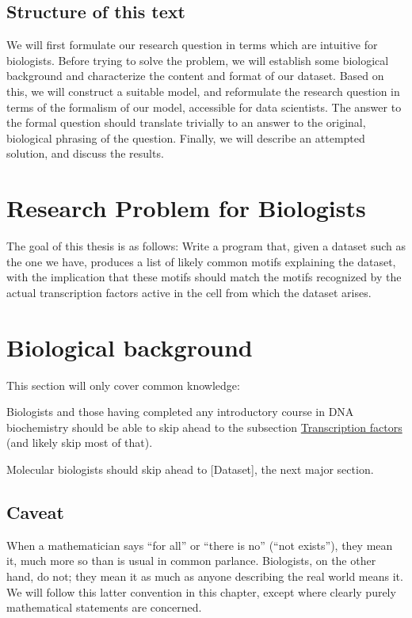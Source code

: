 \documentclass[fleqn]{book}
\begin{document}
\section{Structure of this text}\label{structure-of-this-text}

We will first formulate our research question in terms which are
intuitive for biologists. Before trying to solve the problem, we will
establish some biological background and characterize the content and
format of our dataset. Based on this, we will construct a suitable
model, and reformulate the research question in terms of the formalism
of our model, accessible for data scientists. The answer to the formal
question should translate trivially to an answer to the original,
biological phrasing of the question. Finally, we will describe an
attempted solution, and discuss the results.

\chapter{Research Problem for
Biologists}\label{research-problem-for-biologists}

The goal of this thesis is as follows: Write a program that, given a
dataset such as the one we have, produces a list of likely common motifs
explaining the dataset, with the implication that these motifs should
match the motifs recognized by the actual transcription factors active
in the cell from which the dataset arises.

\chapter{Biological background}\label{biological-background}

This section will only cover common knowledge:

Biologists and those having completed any introductory course in DNA
biochemistry should be able to skip ahead to the subsection
\protect\hyperlink{transcription-factors-1}{Transcription factors} (and
likely skip most of that).

Molecular biologists should skip ahead to {[}Dataset{]}, the next major
section.

\section{Caveat}\label{caveat}

When a mathematician says ``for all'' or ``there is no'' (``not
exists''), they mean it, much more so than is usual in common parlance.
Biologists, on the other hand, do not; they mean it as much as anyone
describing the real world means it. We will follow this latter
convention in this chapter, except where clearly purely mathematical
statements are concerned.
\end{document}
